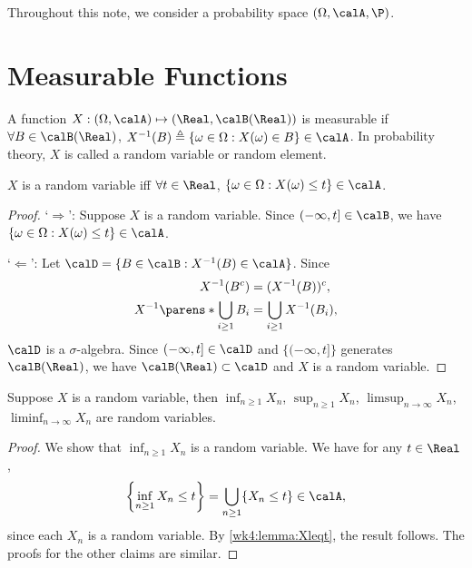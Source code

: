 \documentclass[../aipt.tex]{subfiles}
\begin{document}

Throughout this note, we consider a probability space $(\Omega,\calA,\P)$.

\section{Measurable Functions}

\begin{Definition}
A function $X :(\Omega,\calA) \mapsto (\Real,\calBR)$ is measurable if $\forall B\in\calBR$, $X^{-1}(B)\triangleq\{\omega \in \Omega:X(\omega) \in B\} \in \calA$. In probability theory, $X$ is called a random variable or random element.
\end{Definition}

\begin{Lemma}\label{wk4:lemma:Xleqt}
$X$ is a random variable iff $\forall t \in \Real$, $\{\omega \in \Omega: X(\omega) \leq t\} \in \calA$.
\end{Lemma}
\begin{proof}
`$\Rightarrow$': Suppose $X$ is a random variable. Since $(-\infty,t]\in \calB$, we have $\{\omega \in \Omega: X(\omega) \leq t\} \in \calA$.

`$\Leftarrow$': Let $\calD=\{B\in\calB: X^{-1}(B)\in \calA\}$. Since
\begin{align*}
X^{-1}(B^c)&=(X^{-1}(B))^c,\\
X^{-1}\parens*{\bigcup_{i\geq1}{B_i}}&=\bigcup_{i\geq 1}{X^{-1}(B_i)},
\end{align*}
$\calD$ is a $\sigma$-algebra. Since $(-\infty,t]\in\calD$ and $\{(-\infty,t]\}$ generates $\calBR$, we have $\calBR\subset\calD$ and $X$ is a random variable.
\end{proof}


\begin{Lemma}\label{lem:wk4:infX_rv}
Suppose $X$ is a random variable, then $\inf_{n\geq 1}{X_n}$, $\sup_{n\geq 1}{X_n}$, $\limsup_{n\to \infty}{X_n}$, $\liminf_{n\to \infty}{X_n}$ are random variables.
\end{Lemma}
\begin{proof}
We show that $\inf_{n\geq 1}{X_n}$ is a random variable. We have for any $t\in\Real$,
\begin{align*}
\left\{\inf_{n\geq 1}{X_n}\leq t\right\}=\bigcup_{n \geq 1}\{X_n \leq t\} \in \calA,
\end{align*}
since each $X_n$ is a random variable. By \cref{wk4:lemma:Xleqt}, the result follows. The proofs for the other claims are similar.
\end{proof}
\end{document}

